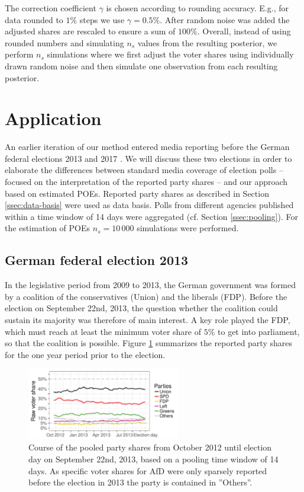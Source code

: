 \documentclass[smallcondensed]{svjour3}     %
\begin{document}
The correction coefficient $\gamma$ is chosen according to rounding accuracy.
E.g., for data rounded to $1\%$ steps we use $\gamma = 0.5\%$. After random noise
was added the adjusted shares are rescaled to ensure a sum of $100\%$. Overall,
instead of using rounded numbers and simulating $n_s$ values from the resulting
posterior, we perform $n_s$ simulations where we first adjust the voter shares
using individually drawn random noise and then simulate one observation from each
resulting posterior.\\


\section{Application} \label{sec:application}
An earlier iteration of our method entered media reporting
before the German federal elections 2013 and 2017 \citep[cf.][]{wahlistik_2013, gelitz_2017}.
We will discuss these two elections in order to elaborate the
differences between standard media coverage of election polls
-- focused on the interpretation of the reported party shares --
and our approach based on estimated POEs. Reported party shares as
described in Section \ref{ssec:data-basis} were used as data basis.
Polls from different agencies published within a time window of 14 days were
aggregated (cf. Section \ref{ssec:pooling}). For the estimation of POEs
$n_{s} = 10\,000$ simulations were performed.


\subsection{German federal election 2013} \label{subsec:2013}
In the legislative period from 2009 to 2013, the German government was formed by
a coalition of the conservatives (Union) and the liberals (FDP). Before the
election on September 22nd, 2013, the question whether the coalition could
sustain its majority was therefore of main interest.
A key role played the FDP, which must reach at least the minimum voter share of $5\%$ to get into parliament,
so that the coalition is possible. Figure \ref{fig:2013} summarizes the reported party
shares for the one year period prior to the election.

\begin{figure}[H]\centering
\includegraphics[width=0.6\textwidth]{figures/2013_pooled_rawShares.pdf}
\caption{Course of the pooled party shares from October 2012 until election day on
September 22nd, 2013, based on a pooling time window of 14 days.
As specific voter shares for AfD were only sparsely reported before the election in 2013
the party is contained in ''Others''.
\label{fig:2013}
}
\end{figure}
\end{document}
